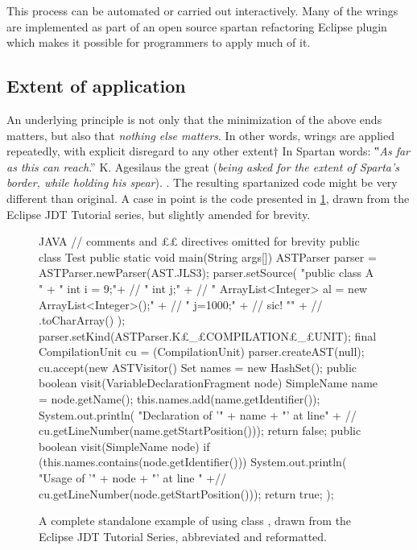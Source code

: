 This process can be automated or carried out interactively. Many of the
wrings are implemented as part of an open source spartan refactoring Eclipse
plugin
which makes it possible for programmers to apply much of it.

\subsection{Extent of application}
An underlying principle is not only that the minimization of
the above ends matters, but also that \emph{nothing else matters}.
In other words, wrings are applied repeatedly, with explicit disregard
to any other extent†{%
  In Spartan words: ‟\textit{As far as this can reach}.” K. Agesilaus the
  great (\textsl{being asked for the extent of Sparta's border, while
  holding his spear}).
}.
The resulting spartanized code might be very different than original.
A case in point is the code presented in \cref{figure:eclipse}, drawn from the
Eclipse JDT Tutorial series,
but slightly amended for brevity.

\begin{figure}[H]
  \caption{A complete standalone example of using class , drawn
    from the Eclipse JDT Tutorial Series, abbreviated and reformatted.} 
    \label{figure:eclipse}
    \begin{code}[listing style={numbered, language=Java},minipage,width=0.98\columnwidth]{JAVA}
// comments and ££ directives omitted for brevity
public class Test {
  public static void main(String args[]) {
    ASTParser parser = ASTParser.newParser(AST.JLS3);
    parser.setSource(
      "public class A {\n" + 
      "  int i = 9;\n"+ //
      "  int j;\n" + //
      "  ArrayList<Integer> al = new ArrayList<Integer>();\n" + //
      "  j=1000;\n" + // sic!
      "}\n" + //
      .toCharArray()
    );
    parser.setKind(ASTParser.K£\_£COMPILATION£\_£UNIT);
    final CompilationUnit cu = (CompilationUnit) parser.createAST(null);
    cu.accept(new ASTVisitor() {
      Set names = new HashSet();
      public boolean visit(VariableDeclarationFragment node) {
        SimpleName name = node.getName();
        this.names.add(name.getIdentifier());
        System.out.println(
          "Declaration of '" + name + "' at line" + //
          cu.getLineNumber(name.getStartPosition()));
        return false; 
      }
      public boolean visit(SimpleName node) {
        if (this.names.contains(node.getIdentifier())) {
          System.out.println(
            "Usage of '" + node + "' at line " +//
            cu.getLineNumber(node.getStartPosition()));
        }
        return true;
      }
    });
  }
}
  \end{code}
\end{figure}


